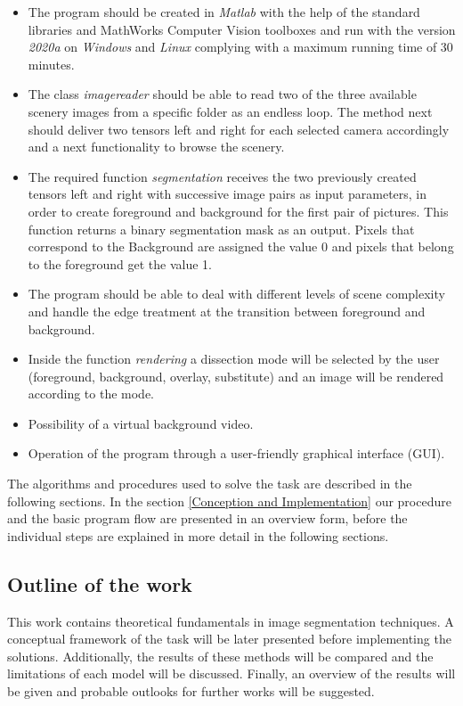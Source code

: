 \begin{itemize}
	
	\item The program should be created in \textit{Matlab} with the help of the standard libraries and MathWorks Computer Vision toolboxes and run with the version \textit{2020a} on \textit{Windows} and \textit{Linux} complying with a maximum running time of 30 minutes.
	
	\item The class \textit{imagereader} should be able to read two of the three available scenery images from a specific folder as an endless loop. The method next should deliver two tensors left and right for each selected camera accordingly and a next functionality to browse the scenery. 
	
	\item The required function \textit{segmentation} receives the two previously created tensors left and right with successive
	image pairs as input parameters, in order to create foreground and background for the first pair of pictures. This function returns a binary segmentation mask as an output. Pixels that correspond to the
	Background are assigned the value 0 and pixels that belong to the foreground get the value 1.
	
	\item The program should be able to deal with different levels of scene complexity and handle the edge treatment at the transition between foreground and background.
	
	\item Inside the function \textit{rendering} a dissection mode will be selected by the user (foreground, background, overlay, substitute) and an image will be rendered according to the mode. 
	
	\item  Possibility of a virtual background video. 
	
	\item Operation of the program through a user-friendly graphical interface (GUI).
	
\end{itemize}

The algorithms and procedures used to solve the task are described in the following sections.
In the section \ref{Conception and Implementation} our procedure and the basic program flow are presented in an overview form, before the individual steps are explained in more detail in the following sections.

\subsection{Outline of the work}

This work contains theoretical fundamentals in image segmentation techniques. 
A conceptual framework of the task will be later presented before implementing the solutions.
Additionally, the results of these methods will be compared and the limitations of each model will be discussed.
Finally, an overview of the results will be given and probable outlooks for further works will be suggested.
